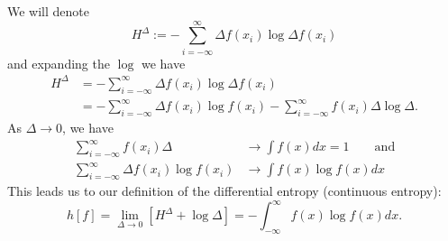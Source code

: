 \documentclass{article}
\newcommand{\defined}{:=}
\begin{document}
We will denote
\begin{equation}
H^{\Delta} \defined - \sum_{i=-\infty}^{\infty} \Delta f(x_i) \log \Delta f(x_i)
\end{equation}
and expanding the $\log$ we have
\begin{align}
H^{\Delta} &= - \sum_{i=-\infty}^{\infty} \Delta f(x_i) \log \Delta f(x_i)\\
&= - \sum_{i=-\infty}^{\infty} \Delta f(x_i) \log f(x_i) -\sum_{i=-\infty}^{\infty} f(x_i) \Delta \log \Delta.
\end{align}
As $\Delta \to 0$, we have
\begin{align}
\sum_{i=-\infty}^{\infty} f(x_i) \Delta &\to \int f(x) dx = 1\qquad \text{and}\\
\sum_{i=-\infty}^{\infty} \Delta f(x_i) \log f(x_i) &\to \int f(x) \log f(x) dx
\end{align}
This leads us to our definition of the differential entropy (continuous entropy):
\begin{equation}
h[f] = \lim_{\Delta \to 0} \left[H^{\Delta} + \log \Delta\right]  = -\int_{-\infty}^{\infty} f(x) \log f(x) dx.
\end{equation}
\end{document}
